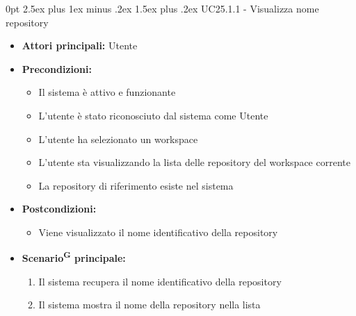 \documentclass[a4paper, 11pt]{article}
\makeatletter
\renewcommand\paragraph{\@startsection{paragraph}{4}
  {0pt}
  {2.5ex plus 1ex minus .2ex}
  {1.5ex plus .2ex}
  {\normalfont\normalsize\bfseries\color{AccentDark}}}
\makeatother
\begin{document}
\paragraph{UC25.1.1 - Visualizza nome repository}\label{UC25.1.1}
\begin{itemize}
	\item \textbf{Attori principali:} Utente
	\item \textbf{Precondizioni:}
	\begin{itemize}
		\item Il sistema è attivo e funzionante
		\item L'utente è stato riconosciuto dal sistema come Utente
		\item L'utente ha selezionato un workspace
		\item L'utente sta visualizzando la lista delle repository del workspace corrente
		\item La repository di riferimento esiste nel sistema
	\end{itemize}
	\item \textbf{Postcondizioni:}
	\begin{itemize}
		\item Viene visualizzato il nome identificativo della repository
	\end{itemize}
	\item \textbf{Scenario\textsuperscript{G} principale:}
	\begin{enumerate}
		\item Il sistema recupera il nome identificativo della repository
		\item Il sistema mostra il nome della repository nella lista
	\end{enumerate}
\end{itemize}
\end{document}
